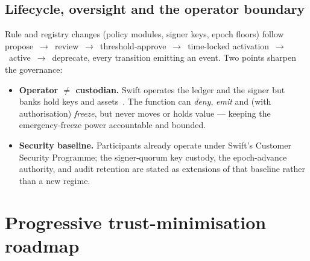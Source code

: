 \documentclass[11pt,a4paper]{article}
\begin{document}
\subsection{Lifecycle, oversight and the operator boundary}
Rule and registry changes (policy modules, signer keys, epoch floors) follow
propose~$\rightarrow$~review~$\rightarrow$~threshold-approve~$\rightarrow$~time-locked
activation~$\rightarrow$~active~$\rightarrow$~deprecate, every transition emitting
an event. Two points sharpen the governance:
\begin{itemize}[leftmargin=1.4em,itemsep=2pt]
  \item \textbf{Operator $\ne$ custodian.} Swift operates the ledger and the
  signer but banks hold keys and assets~\cite{swiftmvp}. The function can
  \emph{deny}, \emph{emit} and (with authorisation) \emph{freeze}, but never moves
  or holds value --- keeping the emergency-freeze power accountable and bounded.
  \item \textbf{Security baseline.} Participants already operate under Swift's
  Customer Security Programme; the signer-quorum key custody, the
  epoch-advance authority, and audit retention are stated as extensions of that
  baseline rather than a new regime.
\end{itemize}

\section{Progressive trust-minimisation roadmap}
\label{sec:roadmap}
\end{document}

